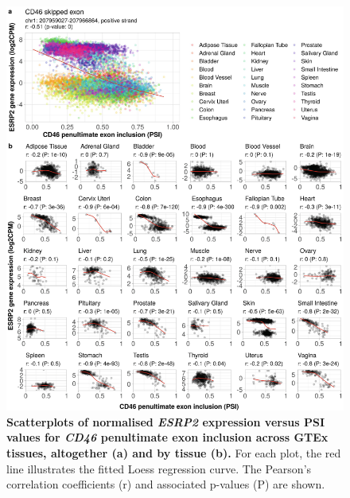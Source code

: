 \begin{figure}[!p]
  \includegraphics[width=1\textwidth]{images/psichomics/8-gtex-cor}
  \centering
  \caption[\emph{ESRP2} expression versus \emph{CD46} penultimate exon PSI in GTEx]{\textbf{Scatterplots of normalised \emph{ESRP2} expression versus PSI values for \emph{CD46} penultimate exon inclusion across GTEx tissues, altogether (a) and by tissue (b).} For each plot, the red line illustrates the fitted Loess regression curve. The Pearson’s correlation coefficients (r) and associated p-values (P) are shown.}
  \label{fig:psichomics-gtex-cor}
\end{figure}

